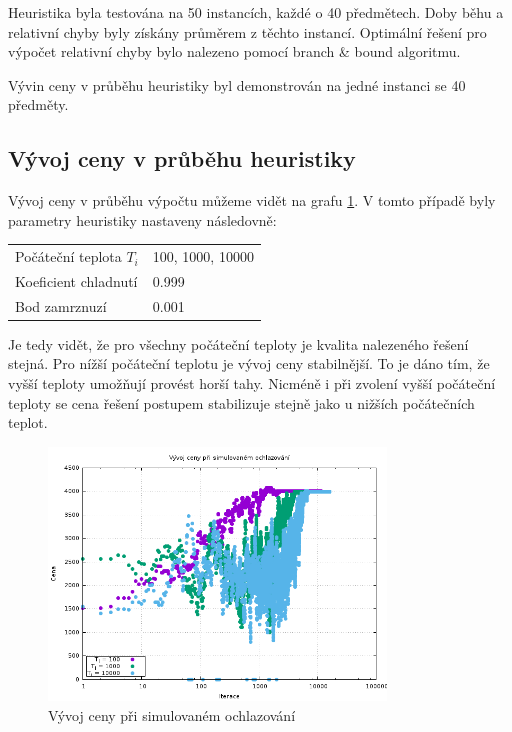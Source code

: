\documentclass[11pt]{article}
\begin{document}
Heuristika byla testována na 50 instancích, každé o 40 předmětech. Doby běhu a relativní chyby byly získány průměrem z těchto instancí. Optimální řešení pro výpočet relativní chyby bylo nalezeno pomocí branch \& bound algoritmu.

Vývin ceny v průběhu heuristiky byl demonstrován na jedné instanci se 40 předměty.

\subsection{Vývoj ceny v průběhu heuristiky}

Vývoj ceny v průběhu výpočtu můžeme vidět na grafu \ref{fig:progress}. V tomto případě byly parametry heuristiky nastaveny následovně: 

\begin{center}
\begin{tabular}{ l l }
	  Počáteční teplota $T_i$ & 100, 1000, 10000 \\
	  Koeficient chladnutí & 0.999 \\
	  Bod zamrznuzí & 0.001 \\
\end{tabular}
\end{center}

Je tedy vidět, že pro všechny počáteční teploty je kvalita nalezeného řešení stejná. Pro nížší počáteční teplotu je vývoj ceny stabilnější. To je dáno tím, že vyšší teploty umožňují provést horší tahy. Nicméně i při zvolení vyšší počáteční teploty se cena řešení postupem stabilizuje stejně jako u nižších počátečních teplot.

\begin{figure}[h!]
	\centering
    	\includegraphics[width=0.8\textwidth]{../grafy/progress.png}
	\caption{Vývoj ceny při simulovaném ochlazování}
	\label{fig:progress}
\end{figure}
\end{document}
